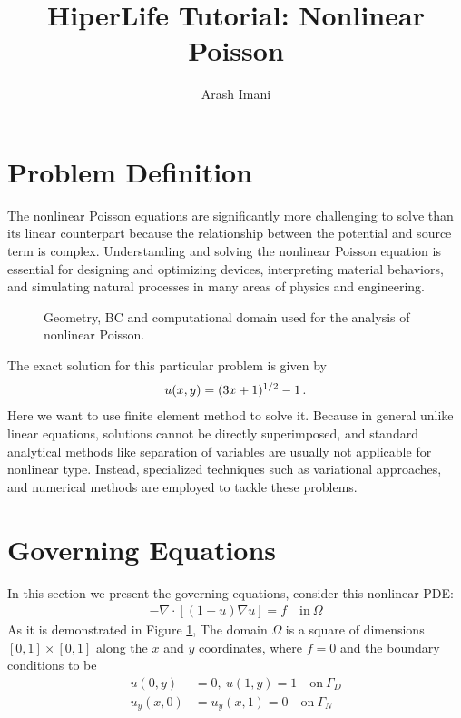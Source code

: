 \documentclass[]{article}
\begin{document}
\title{HiperLife Tutorial: Nonlinear Poisson}
\author{Arash Imani}
\maketitle

\linenumbers

\section{Problem Definition} \label{sec: pd} 
The nonlinear Poisson equations are significantly more challenging to solve than its linear counterpart because the relationship between the potential and source term is complex. Understanding and solving the nonlinear Poisson equation is essential for designing and optimizing devices, interpreting material behaviors, and simulating natural processes in many areas of physics and engineering.
\begin{figure}[htbp]
	\centering
	
	\caption{Geometry, BC and computational domain used for the analysis of nonlinear Poisson.}
	\label{fig_SB}
\end{figure}

The exact solution for this particular problem is given by
\begin{equation}\label{eq1}
	\begin{aligned}
		u(x,y) = (3x +1)^{1/2}-1\thinspace .
	\end{aligned}
\end{equation}
Here we want to use finite element method to solve it. Because in general unlike linear equations, solutions cannot be directly superimposed, and standard analytical methods like separation of variables are usually not applicable for nonlinear type. Instead, specialized techniques such as variational approaches, and numerical methods are employed to tackle these problems.
\section{Governing Equations} \label{sec: ge}
In this section we present the governing equations, consider this nonlinear PDE:\cite{BarattaEtal2023}
\begin{equation}\label{eq2}
	\begin{aligned}
		- \nabla \cdot [(1+u)\nabla u] = f \quad \text{in} \ \Omega
	\end{aligned}
\end{equation}
As it is demonstrated in Figure \ref{fig_SB}, The domain $\Omega$ is a square of dimensions $[0,1] \times [0,1]$ along the $x$ and $y$ coordinates, where $f = 0$ and the boundary conditions to be
\begin{equation}\label{eq3}
	\begin{aligned}
		u(0,y) &= 0, \ u(1,y) = 1\quad \text{on} \ \Gamma_D \\
		u_y(x,0) &=u_y(x,1) =0 \quad \text{on} \ \Gamma_N \\
	\end{aligned}
\end{equation}
\end{document}
